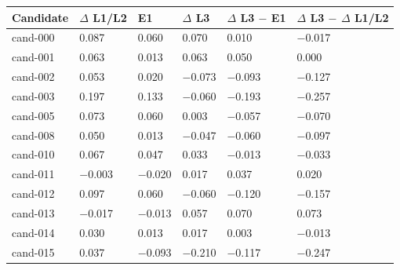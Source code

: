 \begin{tabular}{llllll}
\toprule
Candidate & $\Delta$ L1/L2 & E1 & $\Delta$ L3 & $\Delta$ L3 $-$ E1 & $\Delta$ L3 $-$ $\Delta$ L1/L2 \\
\midrule
cand-000 & 0.087 & 0.060 & 0.070 & 0.010 & $-$0.017 \\
cand-001 & 0.063 & 0.013 & 0.063 & 0.050 & 0.000 \\
cand-002 & 0.053 & 0.020 & $-$0.073 & $-$0.093 & $-$0.127 \\
cand-003 & 0.197 & 0.133 & $-$0.060 & $-$0.193 & $-$0.257 \\
cand-005 & 0.073 & 0.060 & 0.003 & $-$0.057 & $-$0.070 \\
cand-008 & 0.050 & 0.013 & $-$0.047 & $-$0.060 & $-$0.097 \\
cand-010 & 0.067 & 0.047 & 0.033 & $-$0.013 & $-$0.033 \\
cand-011 & $-$0.003 & $-$0.020 & 0.017 & 0.037 & 0.020 \\
cand-012 & 0.097 & 0.060 & $-$0.060 & $-$0.120 & $-$0.157 \\
cand-013 & $-$0.017 & $-$0.013 & 0.057 & 0.070 & 0.073 \\
cand-014 & 0.030 & 0.013 & 0.017 & 0.003 & $-$0.013 \\
cand-015 & 0.037 & $-$0.093 & $-$0.210 & $-$0.117 & $-$0.247 \\
\bottomrule
\end{tabular}
